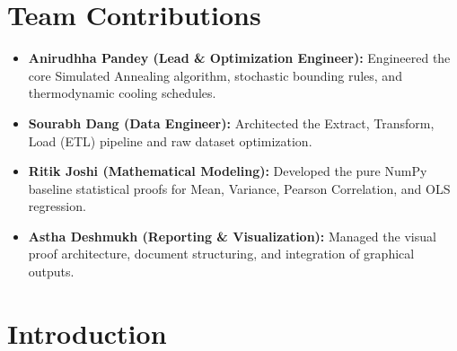 \documentclass[12pt, a4paper]{article}
\begin{document}
\section*{Team Contributions}
\begin{itemize}
    \item \textbf{Anirudhha Pandey (Lead \& Optimization Engineer):} Engineered the core Simulated Annealing algorithm, stochastic bounding rules, and thermodynamic cooling schedules.
    \item \textbf{Sourabh Dang (Data Engineer):} Architected the Extract, Transform, Load (ETL) pipeline and raw dataset optimization.
    \item \textbf{Ritik Joshi (Mathematical Modeling):} Developed the pure NumPy baseline statistical proofs for Mean, Variance, Pearson Correlation, and OLS regression.
    \item \textbf{Astha Deshmukh (Reporting \& Visualization):} Managed the visual proof architecture, document structuring, and integration of graphical outputs.
\end{itemize}

\newpage
\begin{abstract}
Summary statistics are the bedrock of exploratory data analysis, yet relying exclusively on metrics such as mean, variance, Pearson correlation, and regression trajectories introduces critical analytical blind spots. This implementation leverages the theoretical foundations of Anscombe's Quartet and the Datasaurus Dozen to mathematically prove that radically divergent spatial geometries can share identical statistical signatures. Operating under strict constraints, the team developed a custom NumPy statistical engine, intentionally prohibiting abstraction libraries. Furthermore, we engineered a Simulated Annealing (SA) algorithm that successfully perturbed a baseline point cloud (\textit{dino}) into a target geometry (\textit{star}). Over 150,000 iterations, the SA engine achieved an 80.35\% reduction in spatial divergence, strictly bounded by a mathematical Gatekeeper that restricted statistical drift to a 0.1 tolerance limit across all core metrics.
\end{abstract}

\newpage
\tableofcontents
\newpage
\listoffigures
\newpage

\section{Introduction}
\end{document}
